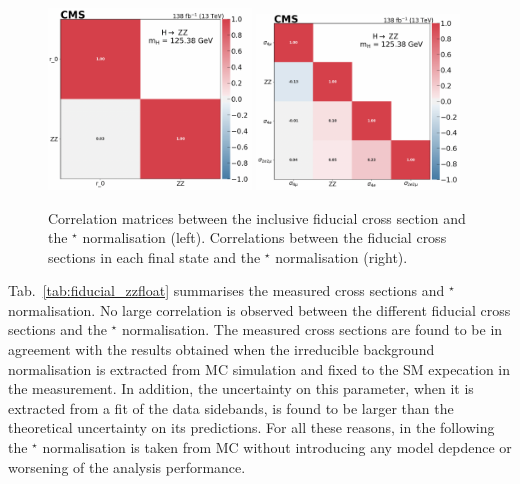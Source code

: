 \begin{figure}[!htb]
	\centering
	\includegraphics[width=0.48\textwidth]{Images/H4L/zznorm/corr_m4l_v3.png}
	\includegraphics[width=0.48\textwidth]{Images/H4L/zznorm/corr_m4l_v2.png}
	\caption{
		Correlation matrices between the inclusive fiducial cross section and the \PZ\PZ$^\star$ normalisation (left). Correlations between the fiducial cross sections in each final state and the \PZ\PZ$^\star$ normalisation (right).
		\label{fig:fiducial_zzfloating_corr}}
\end{figure}


Tab.~\ref{tab:fiducial_zzfloat} summarises the measured cross sections and \PZ\PZ$^\star$ normalisation.
No large correlation is observed between the different fiducial cross sections and the \PZ\PZ$^\star$ normalisation.
The measured cross sections are found to be in agreement with the results obtained when the irreducible background normalisation is extracted from MC simulation and fixed to the SM expecation in the measurement.
In addition, the uncertainty on this parameter, when it is extracted from a fit of the data sidebands, is found to be larger than the theoretical uncertainty on its predictions.
For all these reasons, in the following the \PZ\PZ$^\star$ normalisation is taken from MC without introducing any model depdence or worsening of the analysis performance.

